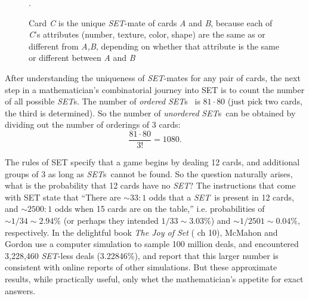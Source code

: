 \documentclass{article}
\newcommand{\SET}{{\em SET}}
\newcommand{\SETs}{{\em SET}s}
\begin{document}
\begin{figure}[!htb]
  \caption{\label{SETMATES}Card {\em C} is the unique \SET-mate of cards {\em A}
    and {\em B}, because each of {\em C}'s attributes (number, texture, color,
    shape) are the same as or different from {\em A,B}, depending on whether
    that attribute is the same or different between {\em A} and {\em B}}.
\end{figure}

After understanding the uniqueness of \SET-mates for any pair of cards, the next
step in a mathematician's combinatorial journey into SET is to count the number
of all possible \SETs. The number of {\em ordered} \SETs~ is $81\cdot 80$ (just
pick two cards, the third is determined). So the number of {\em unordered}
\SETs~can be obtained by dividing out the number of orderings of 3 cards:
$$\frac{81\cdot 80}{3!} = 1080.$$

The rules of SET specify that a game begins by dealing 12 cards, and additional
groups of 3 as long as \SETs~cannot be found. So the question naturally arises,
what is the probability that 12 cards have no \SET?  The instructions that come
with SET \cite{SET} state that ``There are $\sim 33:1$ odds that a \SET~is
present in 12 cards, and \mbox{$\sim 2500:1$} odds when 15 cards are on the
table,'' i.e. probabilities of $\sim 1/34\sim 2.94\%$ (or perhaps they intended
$1/33\sim 3.03\%$) and $\sim 1/2501\sim 0.04\%$, respectively. In the delightful
book {\em The Joy of Set} (\cite{JOS} ch 10), McMahon and Gordon use a computer
simulation to sample 100 million deals, and encountered 3,228,460 \SET-less
deals (3.22846\%), and report that this larger number is consistent with online
reports of other simulations. But these approximate results, while practically
useful, only whet the mathematician's appetite for exact answers.
\end{document}
